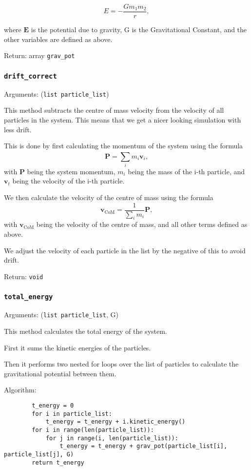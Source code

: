 \documentclass[a4paper, 11pt, british, left=1in, right=1in, top=0.3in, bottom=1in]{article}
\begin{document}
	$$E = -\frac{Gm_1m_2}{r},$$
	
	where $\textbf{E}$ is the potential due to gravity, G is the Gravitational Constant, and the other variables are defined as above. 

	Return: array \texttt{grav\_pot}
	
	\subsubsection{\texttt{drift\_correct}}
	
	Arguments: (\texttt{list particle\_list})
	
	This method subtracts the centre of mass velocity from the velocity of all particles in the system. This means that we get a nicer looking simulation with less drift. 
	
	This is done by first calculating the momentum of the system using the formula $$\textbf{P} = \sum_{i}^{}m_i\textbf{v}_i, $$ with $\textbf{P}$ being the system momentum, $m_i$ being the mass of the i-th particle, and $\textbf{v}_t$ being the velocity of the i-th particle. 
	
	We then calculate the velocity of the centre of mass using the formula $$\textbf{v}_{\text{CoM}} = \frac{1}{\sum_{i}^{}m_i}\textbf{P},$$ with $\textbf{v}_{\text{CoM}}$ being the velocity of the centre of mass, and all other terms defined as above. 
	
	We adjust the velocity of each particle in the list by the negative of this to avoid drift. 
	
	Return: \texttt{void}
	
	\subsubsection{\texttt{total\_energy}}
	
	Arguments: (\texttt{list particle\_list}, G)
	
	This method calculates the total energy of the system. 
	
	First it sums the kinetic energies of the particles. 
	
	Then it performs two nested for loops over the list of particles to calculate the gravitational potential between them.
	
	Algorithm:
	
	\begin{verbatim}
		t_energy = 0
		for i in particle_list:
		    t_energy = t_energy + i.kinetic_energy()
		for i in range(len(particle_list)):
		    for j in range(i, len(particle_list)):
		        t_energy = t_energy + grav_pot(particle_list[i], particle_list[j], G)
		return t_energy
	\end{verbatim}
	
\end{document}

